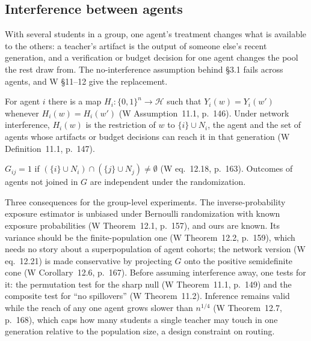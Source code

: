 \documentclass[11pt]{article}
\numberwithin{theorem}{section}
\theoremstyle{definition}
\theoremstyle{problemstyle}
\begin{document}
\subsection{Interference between agents}\label{sec:interf}

With several students in a group, one agent's treatment changes what is available to the others: a teacher's artifact
is the output of someone else's recent generation, and a verification or budget decision for one agent changes the
pool the rest draw from. The no-interference assumption behind \S3.1 fails across agents, and W \S11--12 give the
replacement.

\begin{ass}
For agent $i$ there is a map $H_i:\{0,1\}^n\to\mathcal H$ such that $Y_i(w)=Y_i(w')$ whenever $H_i(w)=H_i(w')$ (W
Assumption~11.1, p.~146). Under network interference, $H_i(w)$ is the restriction of $w$ to $\{i\}\cup N_i$, the agent
and the set of agents whose artifacts or budget decisions can reach it in that generation (W Definition~11.1, p.~147).
\end{ass}

\begin{definition}
$G_{ij}=1$ if $(\{i\}\cup N_i)\cap(\{j\}\cup N_j)\neq\emptyset$ (W eq.~12.18, p.~163). Outcomes of agents not joined
in $G$ are independent under the randomization.
\end{definition}

\begin{remark}
Three consequences for the group-level experiments. The inverse-probability exposure estimator is unbiased under
Bernoulli randomization with known exposure probabilities (W Theorem~12.1, p.~157), and ours are known. Its variance
should be the finite-population one (W Theorem~12.2, p.~159), which needs no story about a superpopulation of agent
cohorts; the network version (W eq.~12.21) is made conservative by projecting $G$ onto the positive semidefinite cone
(W Corollary~12.6, p.~167). Before assuming interference away, one tests for it: the permutation test for the sharp
null (W Theorem~11.1, p.~149) and the composite test for ``no spillovers'' (W Theorem~11.2). Inference remains valid
while the reach of any one agent grows slower than $n^{1/4}$ (W Theorem~12.7, p.~168), which caps how many students a
single teacher may touch in one generation relative to the population size, a design constraint on routing.
\end{remark}
\end{document}
